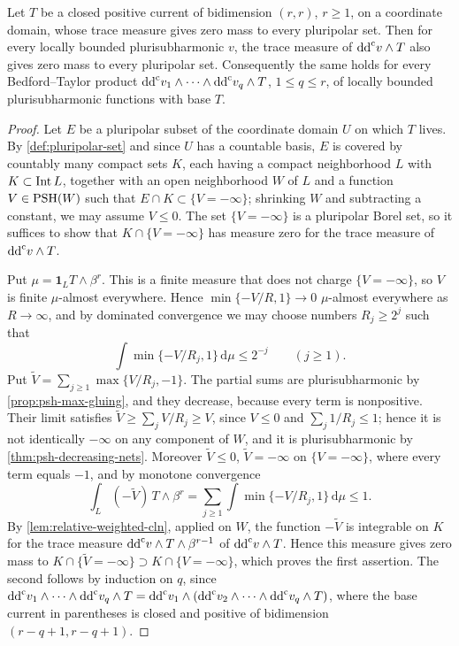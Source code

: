 
\begin{lemma}\label{lem:bounded-product-preserves-nonpolar-current}
Let $T$ be a closed positive current of bidimension $(r,r)$, $r\geq1$, on a coordinate domain, whose trace measure gives zero mass to every pluripolar set. Then for every locally bounded plurisubharmonic $v$, the trace measure of $\mathrm{dd}^{\mathrm{c}} v\wedge T$ also gives zero mass to every pluripolar set. Consequently the same holds for every Bedford--Taylor product $\mathrm{dd}^{\mathrm{c}} v_1\wedge\cdots\wedge\mathrm{dd}^{\mathrm{c}} v_q\wedge T$, $1\leq q\leq r$, of locally bounded plurisubharmonic functions with base $T$.
\end{lemma}
\begin{proof}
Let $E$ be a pluripolar subset of the coordinate domain $U$ on which $T$ lives. By \cref{def:pluripolar-set} and since $U$ has a countable basis, $E$ is covered by countably many compact sets $K$, each having a compact neighborhood $L$ with $K\subset\operatorname{Int} L$, together with an open neighborhood $W$ of $L$ and a function $V\in\mathrm{PSH}(W)$ such that $E\cap K\subset\{V=-\infty\}$; shrinking $W$ and subtracting a constant, we may assume $V\leq0$. The set $\{V=-\infty\}$ is a pluripolar Borel set, so it suffices to show that $K\cap\{V=-\infty\}$ has measure zero for the trace measure of $\mathrm{dd}^{\mathrm{c}} v\wedge T$.

Put $\mu=\mathbf1_LT\wedge\beta^r$. This is a finite measure that does not charge $\{V=-\infty\}$, so $V$ is finite $\mu$-almost everywhere. Hence $\min\{-V/R,1\}\to0$ $\mu$-almost everywhere as $R\to\infty$, and by dominated convergence we may choose numbers $R_j\geq2^j$ such that
\[
 \int\min\{-V/R_j,1\}\,\mathrm d\mu\leq2^{-j}\qquad(j\geq1).
\]
Put $\widetilde V=\sum_{j\geq1}\max\{V/R_j,-1\}$. The partial sums are plurisubharmonic by \cref{prop:psh-max-gluing}, and they decrease, because every term is nonpositive. Their limit satisfies $\widetilde V\geq\sum_jV/R_j\geq V$, since $V\leq0$ and $\sum_j1/R_j\leq1$; hence it is not identically $-\infty$ on any component of $W$, and it is plurisubharmonic by \cref{thm:psh-decreasing-nets}. Moreover $\widetilde V\leq0$, $\widetilde V=-\infty$ on $\{V=-\infty\}$, where every term equals $-1$, and by monotone convergence
\[
 \int_L(-\widetilde V)\,T\wedge\beta^r=\sum_{j\geq1}\int\min\{-V/R_j,1\}\,\mathrm d\mu\leq1.
\]
By \cref{lem:relative-weighted-cln}, applied on $W$, the function $-\widetilde V$ is integrable on $K$ for the trace measure $\mathrm{dd}^{\mathrm{c}} v\wedge T\wedge\beta^{r-1}$ of $\mathrm{dd}^{\mathrm{c}} v\wedge T$. Hence this measure gives zero mass to $K\cap\{\widetilde V=-\infty\}\supset K\cap\{V=-\infty\}$, which proves the first assertion. The second follows by induction on $q$, since $\mathrm{dd}^{\mathrm{c}} v_1\wedge\cdots\wedge\mathrm{dd}^{\mathrm{c}} v_q\wedge T=\mathrm{dd}^{\mathrm{c}} v_1\wedge(\mathrm{dd}^{\mathrm{c}} v_2\wedge\cdots\wedge\mathrm{dd}^{\mathrm{c}} v_q\wedge T)$, where the base current in parentheses is closed and positive of bidimension $(r-q+1,r-q+1)$.
\end{proof}

